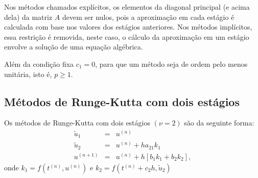  \begin{obs}\label{obs:obs_imp} Nos métodos chamados explícitos, os elementos da diagonal principal (e acima dela) da matriz $A$ devem ser nulos, pois a aproximação em cada estágio é calculada com base nos valores dos estágios anteriores. Nos métodos implícitos, essa restrição é removida, neste caso, o cálculo da aproximação em um estágio envolve a solução de uma equação algébrica.
  \end{obs}

\begin{obs}
Além da condição fixa $c_1=0$, para que um método seja de ordem pelo menos unitária, isto é, $p\geq 1$.
\end{obs}


\subsection{Métodos de Runge-Kutta com dois estágios}\label{eq:RK_2_subsec}
Os métodos de Runge-Kutta com dois estágios $\left(\nu=2\right)$ são da seguinte forma:
\begin{eqnarray}
  \tilde{u}_1 &=&u^{(n)} \\
  \tilde{u}_2 &=&u^{(n)}  + h a_{21}k_1 \\
  u^{(n+1)}&=&u^{(n)}  + h [ b_1k_1+b_2k_2],\label{eq:RK2a}
\end{eqnarray}
onde $k_1=f(t^{(n)},u^{(n)})$ e $k_2=f(t^{(n)}+c_2h,\tilde{u}_2)$


